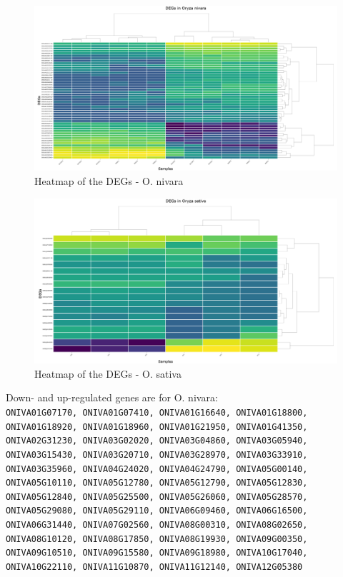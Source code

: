 \begin{figure}[htbp]
    \caption{Heatmap of the DEGs - O. nivara}
    \label{fig:4.4-DEG-Heatmap-Oryza_nivara}
    \includegraphics[width=\textwidth]{../../results/plots-and-tables/4.4-DEG-Heatmap-Oryza_nivara}
\end{figure}

\begin{figure}[htbp]
    \caption{Heatmap of the DEGs - O. sativa}
    \label{fig:4.4-DEG-Heatmap-Oryza_sativa}
    \includegraphics[width=\textwidth]{../../results/plots-and-tables/4.4-DEG-Heatmap-Oryza_sativa}
\end{figure}

\filbreak
Down- and up-regulated genes are for O. nivara:\\
{\scriptsize\texttt{ONIVA01G07170, ONIVA01G07410, ONIVA01G16640, ONIVA01G18800, ONIVA01G18920, ONIVA01G18960, ONIVA01G21950, ONIVA01G41350, ONIVA02G31230, ONIVA03G02020, ONIVA03G04860, ONIVA03G05940, ONIVA03G15430, ONIVA03G20710, ONIVA03G28970, ONIVA03G33910, ONIVA03G35960, ONIVA04G24020, ONIVA04G24790, ONIVA05G00140, ONIVA05G10110, ONIVA05G12780, ONIVA05G12790, ONIVA05G12830, ONIVA05G12840, ONIVA05G25500, ONIVA05G26060, ONIVA05G28570, ONIVA05G29080, ONIVA05G29110, ONIVA06G09460, ONIVA06G16500, ONIVA06G31440, ONIVA07G02560, ONIVA08G00310, ONIVA08G02650, ONIVA08G10120, ONIVA08G17850, ONIVA08G19930, ONIVA09G00350, ONIVA09G10510, ONIVA09G15580, ONIVA09G18980, ONIVA10G17040, ONIVA10G22110, ONIVA11G10870, ONIVA11G12140, ONIVA12G05380
}}


